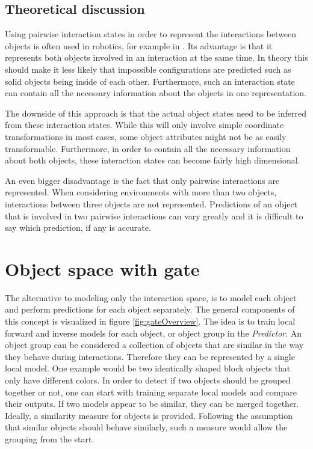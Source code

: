 \subsection{Theoretical discussion}

Using pairwise interaction states in order to represent the interactions between objects is often used in robotics, for example in \cite{pairwiseExample}. Its advantage is that it represents both objects involved in an interaction at the same time. In theory this should make it less likely that impossible configurations are predicted such as solid objects being inside of each other. Furthermore, such an interaction state can contain all the necessary information about the objects in one representation. 

The downside of this approach is that the actual object states need to be inferred from these interaction states. While this will only involve simple coordinate transformations in most cases, some object attributes might not be as easily transformable. Furthermore, in order to contain all the necessary information about both objects, these interaction states can become fairly high dimensional. 

An even bigger disadvantage is the fact that only pairwise interactions are represented. When considering environments with more than two objects, interactions between three objects are not represented. Predictions of an object that is involved in two pairwise interactions can vary greatly and it is difficult to say which prediction, if any is accurate.

\section{Object space with gate \label{sec:gate}}

The alternative to modeling only the interaction space, is to model each object and perform predictions for each object separately. The general components of this concept is visualized in figure \ref{fig:gateOverview}.
The idea is to train local forward and inverse models for each object, or object group in the \textit{Predictor}. %
An object group can be considered a collection of objects that are similar in the way they behave during interactions. Therefore they can be represented by a single local model. One example would be two identically shaped block objects that only have different colors. In order to detect if two objects should be grouped together or not, one can start with training separate local models and compare their outputs. If two models appear to be similar, they can be merged together. Ideally, a similarity measure for objects is provided. Following the assumption that similar objects should behave similarly, such a measure would allow the grouping from the start. 

